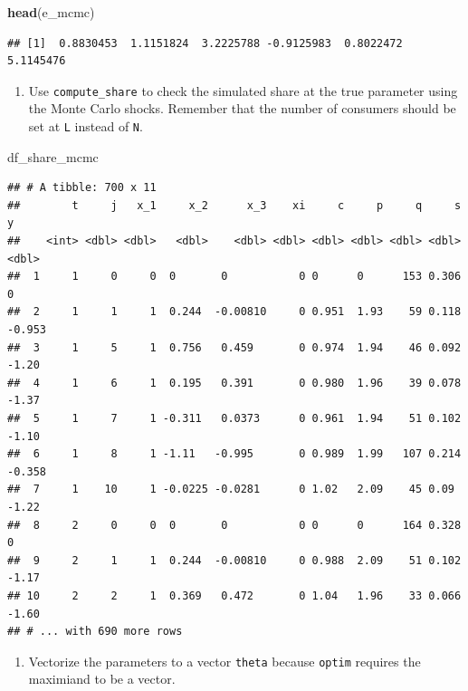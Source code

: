 \documentclass[]{book}
\newenvironment{Shaded}{\begin{snugshade}}{\end{snugshade}}
\newcommand{\KeywordTok}[1]{\textcolor[rgb]{0.13,0.29,0.53}{\textbf{#1}}}
\newcommand{\NormalTok}[1]{#1}
\providecommand{\tightlist}{%
  \setlength{\itemsep}{0pt}\setlength{\parskip}{0pt}}
\begin{document}
\begin{Shaded}
\begin{Highlighting}[]
\KeywordTok{head}\NormalTok{(e_mcmc)}
\end{Highlighting}
\end{Shaded}

\begin{verbatim}
## [1]  0.8830453  1.1151824  3.2225788 -0.9125983  0.8022472  5.1145476
\end{verbatim}

\begin{enumerate}
\def\labelenumi{\arabic{enumi}.}
\setcounter{enumi}{2}
\tightlist
\item
  Use \texttt{compute\_share} to check the simulated share at the true
  parameter using the Monte Carlo shocks. Remember that the number of
  consumers should be set at \texttt{L} instead of \texttt{N}.
\end{enumerate}

\begin{Shaded}
\begin{Highlighting}[]
\NormalTok{df_share_mcmc}
\end{Highlighting}
\end{Shaded}

\begin{verbatim}
## # A tibble: 700 x 11
##        t     j   x_1     x_2      x_3    xi     c     p     q     s      y
##    <int> <dbl> <dbl>   <dbl>    <dbl> <dbl> <dbl> <dbl> <dbl> <dbl>  <dbl>
##  1     1     0     0  0       0           0 0      0      153 0.306  0    
##  2     1     1     1  0.244  -0.00810     0 0.951  1.93    59 0.118 -0.953
##  3     1     5     1  0.756   0.459       0 0.974  1.94    46 0.092 -1.20 
##  4     1     6     1  0.195   0.391       0 0.980  1.96    39 0.078 -1.37 
##  5     1     7     1 -0.311   0.0373      0 0.961  1.94    51 0.102 -1.10 
##  6     1     8     1 -1.11   -0.995       0 0.989  1.99   107 0.214 -0.358
##  7     1    10     1 -0.0225 -0.0281      0 1.02   2.09    45 0.09  -1.22 
##  8     2     0     0  0       0           0 0      0      164 0.328  0    
##  9     2     1     1  0.244  -0.00810     0 0.988  2.09    51 0.102 -1.17 
## 10     2     2     1  0.369   0.472       0 1.04   1.96    33 0.066 -1.60 
## # ... with 690 more rows
\end{verbatim}

\begin{enumerate}
\def\labelenumi{\arabic{enumi}.}
\setcounter{enumi}{4}
\tightlist
\item
  Vectorize the parameters to a vector \texttt{theta} because
  \texttt{optim} requires the maximiand to be a vector.
\end{enumerate}
\end{document}
